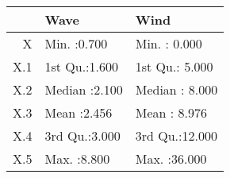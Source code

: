 \begin{tabular}{rll}
  \toprule
 &      Wave &      Wind \\ 
  \midrule
X & Min.   :0.700   & Min.   : 0.000   \\ 
  X.1 & 1st Qu.:1.600   & 1st Qu.: 5.000   \\ 
  X.2 & Median :2.100   & Median : 8.000   \\ 
  X.3 & Mean   :2.456   & Mean   : 8.976   \\ 
  X.4 & 3rd Qu.:3.000   & 3rd Qu.:12.000   \\ 
  X.5 & Max.   :8.800   & Max.   :36.000   \\ 
   \bottomrule
\end{tabular}
